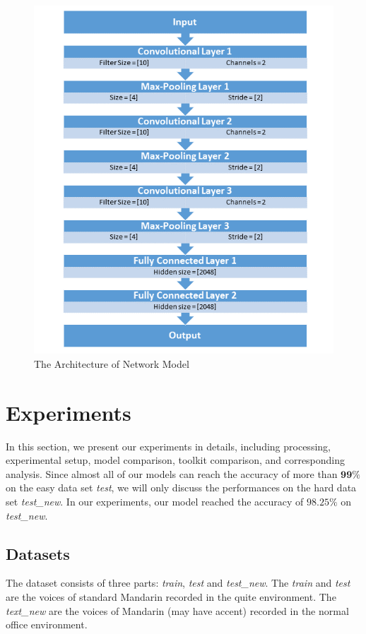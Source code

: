 \documentclass[a4paper, 11pt]{article} %
\begin{document}
\begin{figure}[H]
\begin{minipage}{1\linewidth}
\centerline{\includegraphics[width=17.0cm]{figure/arch.png}}
\end{minipage}
\caption{The Architecture of Network Model}
\label{arch}
\end{figure}

\section{Experiments}
In this section, we present our experiments in details, including processing, experimental setup, model comparison, toolkit comparison, and corresponding analysis. Since almost all of our models can reach the accuracy of more than $\mathbf{99\%}$ on the easy data set \textit{test}, we will only discuss the performances on the hard data set \textit{test\_new}. In our experiments, our model reached the accuracy of $\mathbf{98.25\%}$ on \textit{test\_new}.
\subsection{Datasets}
The dataset consists of three parts: \textit{train}, \textit{test} and \textit{test\_new}. The \textit{train} and \textit{test} are the voices of standard Mandarin recorded in the quite environment. The \textit{text\_new} are the voices of Mandarin (may have accent) recorded in the normal office environment. 
\end{document}

